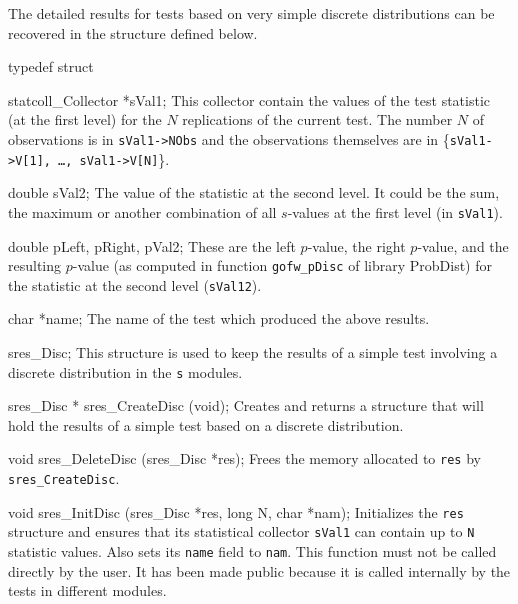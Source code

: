 
The detailed results for tests based on very simple discrete
distributions can be recovered in the structure defined below.

\code

typedef struct {

   statcoll_Collector *sVal1;
\endcode
 \tabb
  This collector contain the values of the test statistic
  (at the first level) for the $N$ replications of the current
  test. The number $N$ of observations is in {\tt sVal1->NObs} and the
  observations themselves are in \{{\tt sVal1->V[1], \ldots, sVal1->V[N]}\}.
 \endtabb
\code

   double sVal2;
\endcode
 \tabb
  The value of the statistic at the second level. It could be the sum,
  the maximum or another combination of all $s$-values at the first
  level (in  {\tt sVal1}).
 \endtabb
\code

   double pLeft, pRight, pVal2;
\endcode
 \tabb
  These are the left $p$-value, the right $p$-value, and the resulting
  $p$-value (as computed in function {\tt gofw\_pDisc} of library
  ProbDist) for the statistic at the second level ({\tt sVal12}).
 \endtabb
\code

   char *name;
\endcode
 \tabb
  The name of the test which produced the above results.
 \endtabb
\code

} sres_Disc;
\endcode
 \tab
  This structure is used to keep the results of a simple
  test involving a discrete distribution in the {\tt s} modules.
 \endtab
\code


sres_Disc * sres_CreateDisc (void);
\endcode
 \tab 
  Creates and returns a structure that will hold the results
  of a simple test based on a discrete distribution. 
 \endtab
\code


void sres_DeleteDisc (sres_Disc *res);
\endcode
 \tab 
  Frees the memory allocated to {\tt res} by {\tt sres\_CreateDisc}.
 \endtab
\code


void sres_InitDisc (sres_Disc *res, long N, char *nam);
\endcode
 \tab 
   Initializes the {\tt res} structure and ensures that its statistical
   collector {\tt sVal1} can contain up to  {\tt N} statistic values.
   Also sets its  {\tt name} field to  {\tt nam}. 
   This function must not be called
   directly by the user. It has been made public because it is called
   internally by the tests in different modules.
 \endtab



